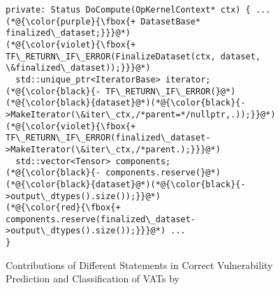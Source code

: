 \begin{figure}[t]
\centering
{}
	\begin{lstlisting}[]
private: Status DoCompute(OpKernelContext* ctx) { ...
(*@{\color{purple}{\fbox{+ DatasetBase* finalized\_dataset;}}}@*)
(*@{\color{violet}{\fbox{+ TF\_RETURN\_IF\_ERROR(FinalizeDataset(ctx, dataset, \&finalized\_dataset));}}}@*)
  std::unique_ptr<IteratorBase> iterator;
(*@{\color{black}{- TF\_RETURN\_IF\_ERROR(}@*)(*@{\color{black}{dataset}@*)(*@{\color{black}{->MakeIterator(\&iter\_ctx,/*parent=*/nullptr,.));}}@*)
(*@{\color{violet}{\fbox{+ TF\_RETURN\_IF\_ERROR(finalized\_dataset->MakeIterator(\&iter\_ctx,/*parent.);}}}@*)
  std::vector<Tensor> components;
(*@{\color{black}{- components.reserve(}@*)(*@{\color{black}{dataset}@*)(*@{\color{black}{->output\_dtypes().size());}}@*)
(*@{\color{red}{\fbox{+ components.reserve(finalized\_dataset->output\_dtypes().size());}}}@*) ...
}
\end{lstlisting}
\vspace{-19pt}
\caption{Contributions of Different Statements in Correct
Vulnerability Prediction and Classification of VATs by {\tool}}
\vspace{-4pt}
\label{gnn-example}
\end{figure}
